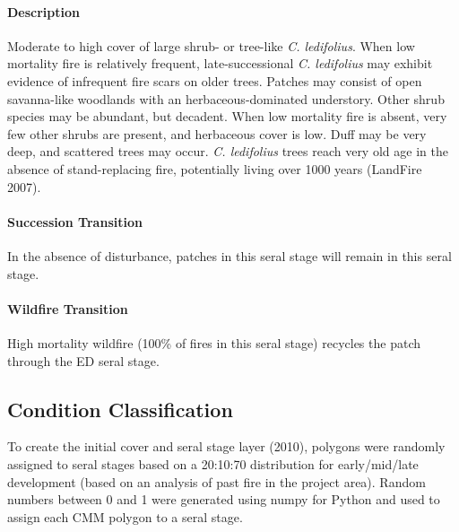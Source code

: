 \paragraph*{Description} Moderate to high cover of large shrub- or tree-like \emph{C. ledifolius}. When low mortality fire is relatively frequent, late-successional \emph{C. ledifolius} may exhibit evidence of infrequent fire scars on older trees. Patches may consist of open savanna-like woodlands with an herbaceous-dominated understory. Other shrub species may be abundant, but decadent. When low mortality fire is absent, very few other shrubs are present, and herbaceous cover is low. Duff may be very deep, and scattered trees may occur. \emph{C. ledifolius} trees reach very old age in the absence of stand-replacing fire, potentially living over 1000 years (LandFire 2007).

\paragraph*{Succession Transition} In the absence of disturbance, patches in this seral stage will remain in this seral stage. 

\paragraph*{Wildfire Transition} High mortality wildfire (100\% of fires in this seral stage) recycles the patch through the ED seral stage.

\noindent\hrulefill

\subsection*{Condition Classification}
To create the initial cover and seral stage layer (2010), polygons were randomly assigned to seral stages based on a 20:10:70 distribution for early/mid/late development (based on an analysis of past fire in the project area). Random numbers between 0 and 1 were generated using numpy for Python and used to assign each CMM polygon to a seral stage.




